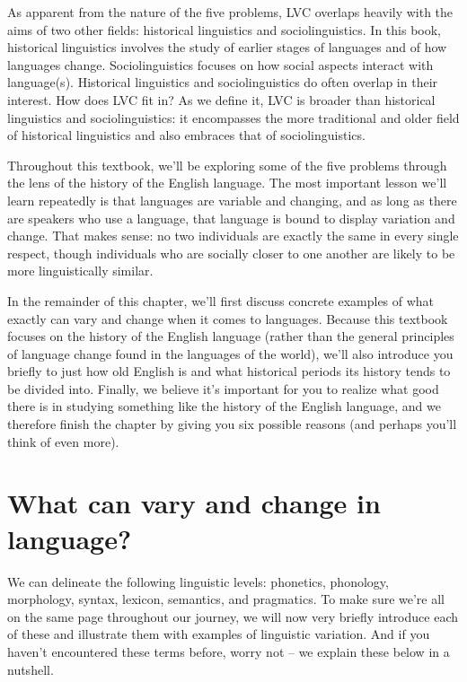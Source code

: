 \noindent As apparent from the nature of the five problems, LVC overlaps heavily with the aims of two other fields: historical linguistics and sociolinguistics. In this book, historical linguistics involves the study of earlier stages of languages and of how languages change. Sociolinguistics focuses on how social aspects interact with language(s). Historical linguistics and sociolinguistics do often overlap in their interest. How does LVC fit in? As we define it, LVC is broader than historical linguistics and sociolinguistics: it encompasses the more traditional and older field of historical linguistics and also embraces that of sociolinguistics. 

\begin{sloppypar}
Throughout this textbook, we'll be exploring some of the five problems through the lens of the history of the English language. The most important lesson we'll learn repeatedly is that languages are variable and changing, and as long as there are speakers who use a language, that language is bound to display variation and change. That makes sense: no two individuals are exactly the same in every single respect, though individuals who are socially closer to one another are likely to be more linguistically similar.
\end{sloppypar}

In the remainder of this chapter, we'll first discuss concrete examples of what exactly can vary and change when it comes to languages. Because this textbook focuses on the history of the English language (rather than the general principles of language change found in the languages of the world), we'll also introduce you briefly to just how old English is and what historical periods its history tends to be divided into. Finally, we believe it's important for you to realize what good there is in studying something like the history of the English language, and we therefore finish the chapter by giving you six possible reasons (and perhaps you'll think of even more).

\section{What can vary and change in language?}
We can delineate the following linguistic levels: phonetics, phonology, morphology, syntax, lexicon, semantics, and pragmatics. To make sure we're all on the same page throughout our journey, we will now very briefly introduce each of these and illustrate them with examples of linguistic variation. And if you haven't encountered these terms before, worry not -- we explain these below in a nutshell.

